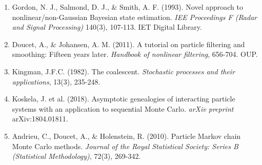 \documentclass[final, 12pt]{beamer}
\newlength{\colwidth}
\begin{document}
\begin{frame}
\begin{columns}
\begin{column}{\colwidth}
\begin{block}
\vspace*{-20pt}

\small{
\begin{enumerate}
\item Gordon, N. J., Salmond, D. J., \& Smith, A. F. (1993). Novel approach to nonlinear/non-Gaussian Bayesian state estimation. \textit{IEE Proceedings F (Radar and Signal Processing)} 140(3), 107-113. IET Digital Library.
\item Doucet, A., \& Johansen, A. M. (2011). A tutorial on particle filtering and smoothing: Fifteen years later. \textit{Handbook of nonlinear filtering}, 656-704. OUP.
\item Kingman, J.F.C. (1982). The coalescent. \textit{Stochastic processes and their applications}, 13(3), 235-248.
\item Koskela, J. et al. (2018).  Asymptotic genealogies of interacting particle systems with an application to sequential Monte Carlo. \textit{arXiv preprint} arXiv:1804.01811.
\item Andrieu, C., Doucet, A., \& Holenstein, R. (2010). Particle Markov chain Monte Carlo methods. \textit{Journal of the Royal Statistical Society: Series B (Statistical Methodology)}, 72(3), 269-342.
\end{enumerate}
}
\end{block}

\end{column}
\end{columns}

\end{frame}
\end{document}
